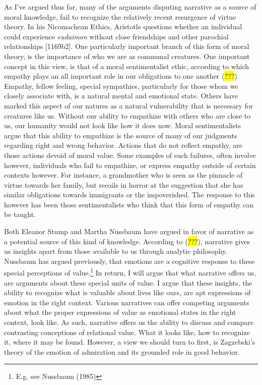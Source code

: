 \documentclass[
  letterpaper,
  DIV=11,
  numbers=noendperiod]{scrartcl}
\theoremstyle{remark}
\begin{document}
As I've argued thus far, many of the arguments disputing narrative as a
source of moral knowledge, fail to recognize the relatively recent
resurgence of virtue theory. In his Nicomachean Ethics, Aristotle
questions whether an individual could experience \emph{eudaimon} without
close friendships and other parochial relationships {[}1169b2{]}. One
particularly important branch of this form of moral theory, is the
importance of who we are as communal creatures. One important concept in
this view, is that of a moral sentimentalist ethic, according to which
empathy plays an all important role in our obligations to one another
(\hl{???}). Empathy, fellow feeling, special sympathies, particularly
for those whom we closely associate with, is a natural mental and
emotional state. Others have marked this aspect of our natures as a
natural vulnerability that is necessary for creatures like us. Without
our ability to empathize with others who are close to us, our humanity
would not look like how it does now. Moral sentimentalists argue that
this ability to empathize is the source of many of our judgments
regarding right and wrong behavior. Actions that do not reflect empathy,
are those actions devoid of moral value. Some examples of such failures,
often involve however, individuals who fail to empathize, or express
empathy outside of certain contexts however. For instance, a grandmother
who is seen as the pinnacle of virtue towards her family, but recoils in
horror at the suggestion that she has similar obligations towards
immigrants or the impoverished. The response to this however has been
those sentimentalists who think that this form of empathy can be taught.

Both Eleanor Stump and Martha Nussbaum have argued in favor of narrative
as a potential source of this kind of knowledge. According to
(\hl{???}), narrative gives us insights apart from those available to us
through analytic philosophy. Nussbaum has argued previously, that
emotions are a cognitive response to these special perceptions of
value.\footnote{E.g. see Nussbaum (1985)} In return, I will argue that
what narrative offers us, are arguments about these special units of
value. I argue that these insights, the ability to recognize what is
valuable about lives like ours, are apt expressions of emotion in the
right context. Various narratives can offer competing arguments about
what the proper expressions of value as emotional states in the right
context, look like. As such, narrative offers us the ability to discuss
and compare contrasting conceptions of relational value. What it looks
like, how to recognize it, where it may be found. However, a view we
should turn to first, is Zagzebski's theory of the emotion of admiration
and its grounded role in good behavior.
\end{document}
